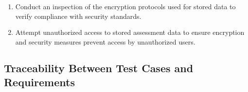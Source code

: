\documentclass[12pt, titlepage]{article}
\begin{document}
\begin{itemize}
\begin{mdframed}[linewidth=0.5mm]
\begin{mdframed}[linewidth=0.5mm]
\begin{enumerate}[noitemsep]
        \item Conduct an inspection of the encryption protocols used for stored data to verify compliance with security standards.
        \item Attempt unauthorized access to stored assessment data to ensure encryption and security measures prevent access by unauthorized users.
      \end{enumerate}
  \end{mdframed}
  \end{mdframed}
\end{itemize}

\newpage 
\begin{landscape}
\subsection{Traceability Between Test Cases and Requirements}


\end{landscape}
\end{document}
